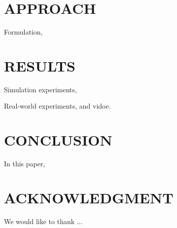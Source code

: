 \documentclass[letterpaper, 10 pt, conference]{ieeeconf}  %
\begin{document}
\section{APPROACH} \label{sec:approach} 

Formulation, 

\section{RESULTS} \label{sec:results} 

Simulation experiments, 

Real-world experiments, and vidoe. 

\section{CONCLUSION} \label{sec:conclusion} 

In this paper, 


\addtolength{\textheight}{-10cm}   %

\section*{ACKNOWLEDGMENT}

We would like to thank ... 





\end{document}

